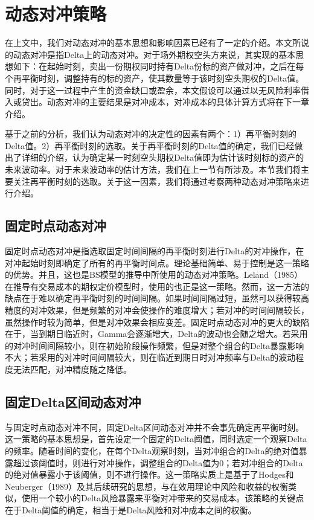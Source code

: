 \section{动态对冲策略}

在上文中，我们对动态对冲的基本思想和影响因素已经有了一定的介绍。本文所说的动态对冲是指Delta上的动态对冲。对于场外期权空头方来说，其实现的基本思想如下：在起始时刻，卖出一份期权同时持有Delta份标的资产做对冲，之后在每个再平衡时刻，调整持有的标的资产，使其数量等于该时刻空头期权的Delta值。同时，对于这一过程中产生的资金缺口或盈余，本文假设可以通过以无风险利率借入或贷出。动态对冲的主要结果是对冲成本，对冲成本的具体计算方式将在下一章介绍。

基于之前的分析，我们认为动态对冲的决定性的因素有两个：1）再平衡时刻的Delta值。2）再平衡时刻的选取。关于再平衡时刻的Delta值的确定，我们已经做出了详细的介绍，认为确定某一时刻空头期权Delta值即为估计该时刻标的资产的未来波动率。对于未来波动率的估计方法，我们在上一节有所涉及。本节我们将主要关注再平衡时刻的选取。关于这一因素，我们将通过考察两种动态对冲策略来进行介绍。

\subsection{固定时点动态对冲}

固定时点动态对冲是指选取固定时间间隔的再平衡时刻进行Delta的对冲操作，在对冲起始时刻即确定了所有的再平衡时间点。理论基础简单、易于控制是这一策略的优势。并且，这也是BS模型的推导中所使用的动态对冲策略。Leland（1985）\cite{leland1985option}在推导有交易成本的期权定价模型时，使用的也正是这一策略。然而，这一方法的缺点在于难以确定再平衡时刻的时间间隔。如果时间间隔过短，虽然可以获得较高精度的对冲效果，但是频繁的对冲会使操作的难度增大；若对冲的时间间隔较长，虽然操作时较为简单，但是对冲效果会相应变差。固定时点动态对冲的更大的缺陷在于，当到期日临近时，Gamma会逐渐增大，Delta的波动也会随之增大。若采用的对冲时间间隔较小，则在初始阶段操作频繁，但是对整个组合的Delta暴露影响不大；若采用的对冲时间间隔较大，则在临近到期日时对冲频率与Delta的波动程度无法匹配，对冲精度随之降低。

\subsection{固定Delta区间动态对冲}

与固定时点动态对冲不同，固定Delta区间动态对冲并不会事先确定再平衡时刻。这一策略的基本思想是，首先设定一个固定的Delta阈值，同时选定一个观察Delta的频率。随着时间的变化，在每个Delta观察时刻，当对冲组合的Delta的绝对值暴露超过该阈值时，则进行对冲操作，调整组合的Delta值为0；若对冲组合的Delta的绝对值暴露小于该阈值，则不进行操作。这一策略实质上是基于了Hodges和Neuberger（1989）\cite{hodges1989optimal}及其后续研究的思想，与在效用理论中风险和收益的权衡类似，使用一个较小的Delta风险暴露来平衡对冲带来的交易成本。该策略的关键点在于Delta阈值的确定，相当于是Delta风险和对冲成本之间的权衡。

